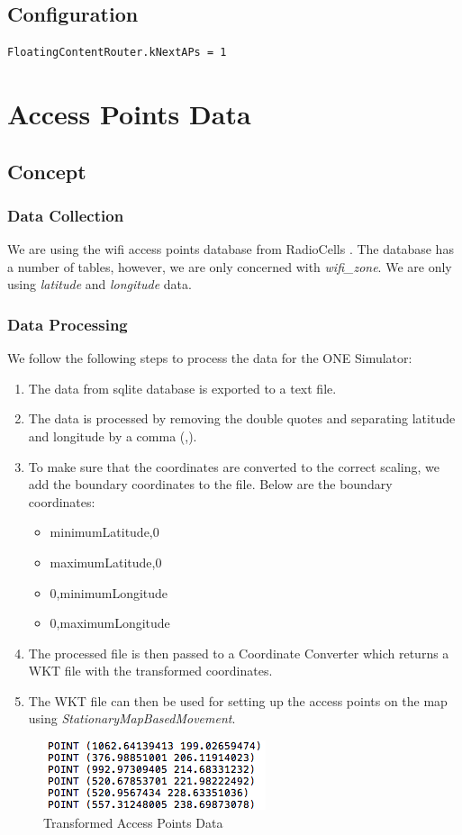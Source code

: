 \subsection{Configuration}
\begin{lstlisting}[language=bash]
FloatingContentRouter.kNextAPs = 1
\end{lstlisting}
\newpage
\section{Access Points Data}
\subsection{Concept}
\subsubsection{Data Collection}
We are using the wifi access points database from RadioCells \cite{wifi-data}. The database has a number of tables, however, we are only concerned with \textit{wifi\_zone}. We are only using \textit{latitude} and \textit{longitude} data.
\subsubsection{Data Processing}
We follow the following steps to process the data for the ONE Simulator:
\begin{enumerate}
	\item The data from sqlite database is exported to a text file. 
	\item The data is processed by removing the double quotes and separating latitude and longitude by a comma (,).
	\item To make sure that the coordinates are converted to the correct scaling, we add the boundary coordinates to the file. Below are the boundary coordinates:
	\begin{itemize}
		\item minimumLatitude,0
		\item maximumLatitude,0
		\item 0,minimumLongitude
		\item 0,maximumLongitude
	\end{itemize}
	\item The processed file is then passed to a Coordinate Converter which returns a WKT file with the transformed coordinates.
	\item The WKT file can then be used for setting up the access points on the map using \textit{StationaryMapBasedMovement}.
\end{enumerate}
\begin{figure}[h]
	\centering
	\includegraphics{./figures/access-points-data}
	\caption{Transformed Access Points Data}
\end{figure}
